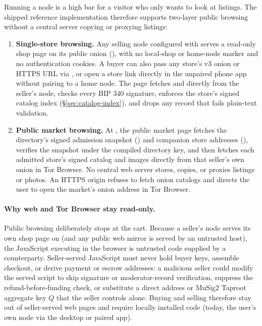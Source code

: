Running a node is a high bar for a visitor who only wants to look at listings. The shipped reference implementation therefore supports two-layer public browsing without a central server copying or proxying listings:
\begin{enumerate}
  \item \textbf{Single-store browsing.} Any selling node configured with  serves a read-only shop page on its public onion (), with no local-shop or home-node marker and no authentication cookies. A buyer can also pass any store's v3 onion or HTTPS URL via , or open a store link directly in the unpaired phone app without pairing to a home node. The page fetches  and  directly from the seller's node, checks every BIP 340 signature, enforces the store's signed catalog index (\S\ref{sec:catalog-index}), and drops any record that fails plain-text validation.
  \item \textbf{Public market browsing.} At \code{/}, the public market page fetches the directory's signed admission snapshot () and companion store addresses (), verifies the snapshot under the compiled directory key, and then fetches each admitted store's signed catalog and images directly from that seller's own onion in Tor Browser. No central web server stores, copies, or proxies listings or photos. An HTTPS origin refuses to fetch onion catalogs and directs the user to open the market's onion address in Tor Browser.
\end{enumerate}

\paragraph{Why web and Tor Browser stay read-only.} Public browsing deliberately stops at the cart. Because a seller's node serves its own shop page on  (and any public web mirror is served by an untrusted host), the JavaScript executing in the browser is untrusted code supplied by a counterparty. Seller-served JavaScript must never hold buyer keys, assemble checkout, or derive payment or escrow addresses: a malicious seller could modify the served script to skip signature or moderator-record verification, suppress the refund-before-funding check, or substitute a direct address or MuSig2 Taproot aggregate key $Q$ that the seller controls alone. Buying and selling therefore stay out of seller-served web pages and require locally installed code (today, the user's own node via the desktop or paired app).

